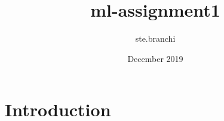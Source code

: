 \documentclass{article}
\title{ml-assignment1}
\author{ste.branchi }
\date{December 2019}
\begin{document}
\maketitle

\section{Introduction}
\end{document}
